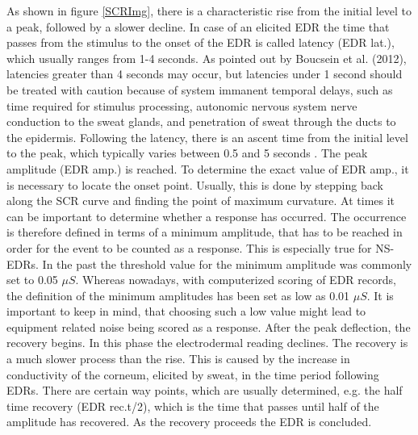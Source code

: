 As shown in figure \ref{SCRImg}, there is a characteristic rise from the initial level to a peak, followed by a slower decline. In case of an elicited EDR the time that passes from the stimulus to the onset of the EDR is called latency (EDR lat.), which usually ranges from 1-4 seconds. As pointed out by Boucsein et al. (2012), latencies greater than 4 seconds may occur, but latencies under 1 second should be treated with caution because of system immanent temporal delays, such as time required for stimulus processing, autonomic nervous system nerve conduction to the sweat glands, and penetration of sweat through the ducts to the epidermis. Following the latency, there is an ascent time from the initial level to the peak, which typically varies between 0.5 and 5 seconds \citep{boucsein2012electrodermal}. The peak amplitude (EDR amp.) is reached. To determine the exact value of EDR amp., it is necessary to locate the onset point. Usually, this is done by stepping back along the SCR curve and finding the point of maximum curvature.
At times it can be important to determine whether a response has occurred. The occurrence is therefore defined in terms of a minimum amplitude, that has to be reached in order for the event to be counted as a response. This is especially true for NS-EDRs. In the past the threshold value for the minimum amplitude was commonly set to 0.05 $\mu S$. Whereas nowadays, with computerized scoring of EDR records, the definition of the minimum amplitudes has been set as low as 0.01 $\mu S$. It is important to keep in mind, that choosing such a low value might lead to equipment related noise being scored as a response. After the peak deflection, the recovery begins. In this phase the electrodermal reading declines. The recovery is a much slower process than the rise. This is caused by the increase in conductivity of the corneum, elicited by sweat, in the time period following EDRs. There are certain way points, which are usually determined, e.g. the half time recovery (EDR rec.t/2), which is the time that passes until half of the amplitude has recovered. As the recovery proceeds the EDR is concluded.

